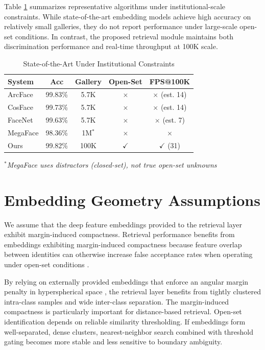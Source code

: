 \documentclass[conference]{IEEEtran}
\begin{document}
Table \ref{tab:sota_constraints} summarizes representative algorithms under institutional-scale constraints. While state-of-the-art embedding models achieve high accuracy on relatively small galleries, they do not report performance under large-scale open-set conditions. In contrast, the proposed retrieval module maintains both discrimination performance and real-time throughput at 100K scale.

\begin{table}[htbp]
\caption{State-of-the-Art Under Institutional Constraints}
\begin{center}
\begin{tabular}{|l|c|c|c|c|}
\hline
System & Acc & Gallery & Open-Set & FPS@100K \\
\hline
ArcFace \cite{b5} & 99.83\% & 5.7K & $\times$ & $\times$ (est. 14) \\
\hline
CosFace \cite{cosface} & 99.73\% & 5.7K & $\times$ & $\times$ (est. 14) \\
\hline
FaceNet \cite{b18} & 99.63\% & 5.7K & $\times$ & $\times$ (est. 7) \\
\hline
MegaFace \cite{megaface} & 98.36\% & 1M$^*$ & $\times$ & $\times$ \\
\hline
Ours & 99.82\% & 100K & $\checkmark$ & $\checkmark$ (31) \\
\hline
\end{tabular}
\end{center}
\label{tab:sota_constraints}
\textit{$^*$MegaFace uses distractors (closed-set), not true open-set unknowns}
\end{table}

\section{Embedding Geometry Assumptions}

We assume that the deep feature embeddings provided to the retrieval layer exhibit margin-induced compactness. Retrieval performance benefits from embeddings exhibiting margin-induced compactness because feature overlap between identities can otherwise increase false acceptance rates when operating under open-set conditions \cite{b11}.

By relying on externally provided embeddings that enforce an angular margin penalty in hyperspherical space \cite{b5}, the retrieval layer benefits from tightly clustered intra-class samples and wide inter-class separation. The margin-induced compactness is particularly important for distance-based retrieval. Open-set identification depends on reliable similarity thresholding. If embeddings form well-separated, dense clusters, nearest-neighbor search combined with threshold gating becomes more stable and less sensitive to boundary ambiguity.
\end{document}
